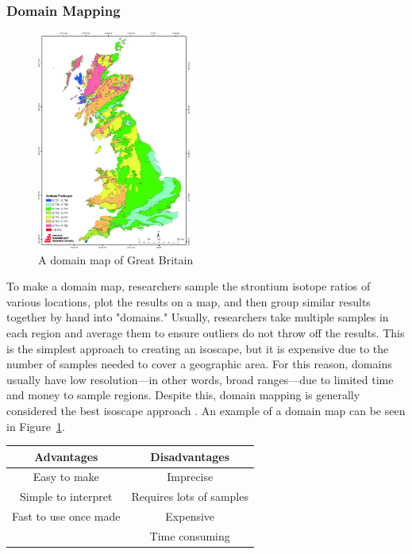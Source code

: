 \documentclass[a4paper, 12pt]{article}
\begin{document}
\subsubsection{Domain Mapping}
\begin{figure}[htbp]
    \centering
    \includegraphics[width=0.45\textwidth]{domain_mapping.jpg}
    \caption{A domain map of Great Britain \citep{evans2010}}
    \label{fig:domain_mapping}
\end{figure}
To make a domain map, researchers sample the strontium isotope ratios of
various locations, plot the results on a map, and then group similar results
together by hand into "domains." Usually, researchers take multiple samples
in each region and average them to ensure outliers do not throw off the results.
This is the simplest approach to creating an isoscape, but it is expensive due to the number
of samples needed to cover a geographic area. For this reason,
domains usually have low resolution—in other words, broad ranges—due to
limited time and money to sample regions.
Despite this, domain mapping is generally considered the best isoscape approach \citep{holt2021}.
An example of a domain map can be seen in Figure~\ref{fig:domain_mapping}.


\begin{center}
    \begin{tabular}{||c | c||}
        \hline
        Advantages            & Disadvantages            \\ [0.5ex]
        \hline\hline
        Easy to make          & Imprecise                \\
        \hline
        Simple to interpret   & Requires lots of samples \\
        \hline
        Fast to use once made & Expensive                \\
        \hline
                              & Time consuming           \\ [1ex]
        \hline
    \end{tabular}
\end{center}
\end{document}

